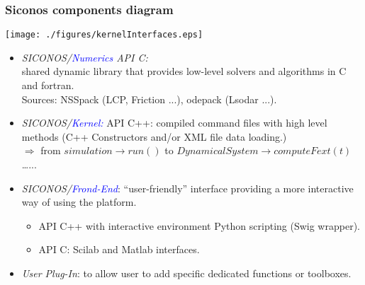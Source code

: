 \frame
{
  \frametitle{Siconos components diagram}
  \begin{center}\texttt{[image: ./figures/kernelInterfaces.eps]}\end{center}
  \pause
  \begin{itemize}
  \item <2-> \emph{SICONOS/\textcolor{blue}{Numerics} API C:} \\
    shared dynamic library that provides low-level solvers and algorithms in C and fortran. \\
      Sources:  NSSpack (LCP, Friction ...), odepack (Lsodar ...).
  \item <3-> \emph{SICONOS/\textcolor{blue}{Kernel:}} 
API C++: compiled command files with high level methods (C++ Constructors and/or XML file data loading.) \\
      $\Rightarrow$ from $simulation\rightarrow run()$ to $DynamicalSystem\rightarrow computeFext(t)$ \ldots ... 
  \item <4-> \emph{SICONOS/\textcolor{blue}{Frond-End}}: ``user-friendly'' interface providing a more interactive way of using the platform.
    \begin{itemize}
    \item API C++ with interactive environment Python scripting (Swig wrapper).
    \item API C: Scilab and Matlab interfaces.
    \end{itemize}
  \item<5-> \emph{User Plug-In}: to allow user to add specific dedicated functions or toolboxes.
  \end{itemize}
}
